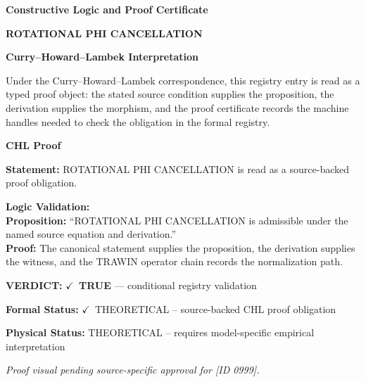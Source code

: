 \clearpage
\begingroup\tzpsupportsetup
\noindent\textbf{\fontsize{10.8pt}{12.8pt}\selectfont [ID 0999] Constructive Logic and Proof Certificate}\par
\noindent\textbf{\fontsize{10pt}{12pt}\selectfont ROTATIONAL PHI CANCELLATION}\par
\vspace{0.45em}
\begingroup
\footnotesize
\setlength{\parskip}{0.22em}
\setlength{\parindent}{0pt}
\noindent\textbf{Curry--Howard--Lambek Interpretation}\par
Under the Curry--Howard--Lambek correspondence, this registry entry is read as a typed proof
object: the stated source condition supplies the proposition, the derivation supplies the
morphism, and the proof certificate records the machine handles needed to check the obligation
in the formal registry.

\vspace{0.45em}
\noindent\textbf{CHL Proof}\par
\textbf{Statement:} ROTATIONAL PHI CANCELLATION is read as a source-backed proof obligation.

\textbf{Logic Validation:}\\
\textbf{Proposition:} ``ROTATIONAL PHI CANCELLATION is admissible under the named source equation and derivation.''\\
\textbf{Proof:} The canonical statement supplies the proposition, the derivation supplies the witness, and the TRAWIN operator chain records the normalization path.

\textbf{VERDICT:} \ensuremath{\checkmark}\ \textbf{TRUE} --- conditional registry validation

\textbf{Formal Status:} \ensuremath{\checkmark}\ THEORETICAL -- source-backed CHL proof obligation

\textbf{Physical Status:} THEORETICAL -- requires model-specific empirical interpretation
\par\vspace{0.45em}
\par
\vfill
\begingroup\footnotesize\itshape
Proof visual pending source-specific approval for [ID 0999].
\par\endgroup
\vfill
\endgroup
\endgroup
